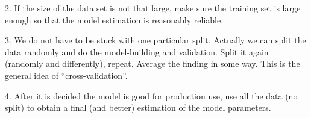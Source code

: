 \documentclass[12pt]{article}
\begin{document}
2. If the size of the data set is not that large,
make sure the training set is large enough so that the model estimation
is reasonably reliable.

3. We do not have to be stuck with one particular split.
Actually we can split the data randomly
and do the model-building and validation.
Split it again (randomly and differently), repeat.
Average the finding in some way.
This is the general idea of ``cross-validation''.

4. After it is decided the model is good for production use,
use all the data (no split) to obtain a final (and better) estimation of
the model parameters.
\end{document}
